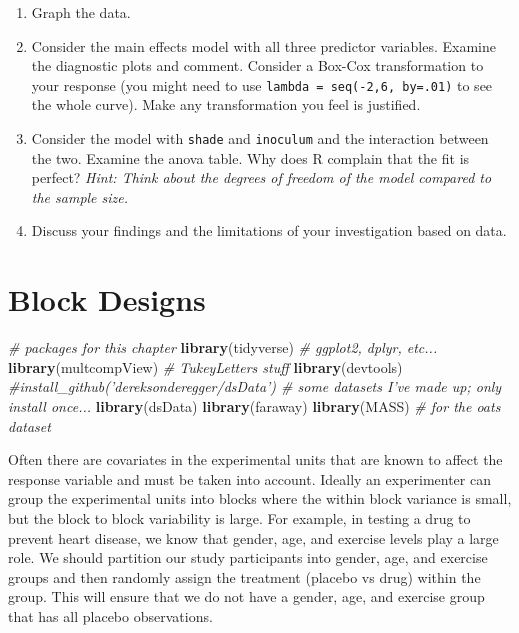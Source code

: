 \documentclass[]{book}
\newenvironment{Shaded}{\begin{snugshade}}{\end{snugshade}}
\newcommand{\KeywordTok}[1]{\textcolor[rgb]{0.13,0.29,0.53}{\textbf{{#1}}}}
\newcommand{\CommentTok}[1]{\textcolor[rgb]{0.56,0.35,0.01}{\textit{{#1}}}}
\newcommand{\NormalTok}[1]{{#1}}
\providecommand{\tightlist}{%
  \setlength{\itemsep}{0pt}\setlength{\parskip}{0pt}}
\theoremstyle{definition}
\theoremstyle{definition}
\theoremstyle{remark}
\begin{document}
\begin{enumerate}
  \begin{enumerate}
  \def\labelenumii{\alph{enumii}.}
  \tightlist
  \item
    Graph the data.
  \item
    Consider the main effects model with all three predictor variables.
    Examine the diagnostic plots and comment. Consider a Box-Cox
    transformation to your response (you might need to use
    \texttt{lambda\ =\ seq(-2,6,\ by=.01)} to see the whole curve). Make
    any transformation you feel is justified.
  \item
    Consider the model with \texttt{shade} and \texttt{inoculum} and the
    interaction between the two. Examine the anova table. Why does R
    complain that the fit is perfect? \emph{Hint: Think about the
    degrees of freedom of the model compared to the sample size.}
  \item
    Discuss your findings and the limitations of your investigation
    based on data.
  \end{enumerate}
\end{enumerate}

\chapter{Block Designs}\label{block-designs}

\begin{Shaded}
\begin{Highlighting}[]
\CommentTok{# packages for this chapter}
\KeywordTok{library}\NormalTok{(tidyverse)    }\CommentTok{# ggplot2, dplyr, etc...}
\KeywordTok{library}\NormalTok{(multcompView) }\CommentTok{# TukeyLetters stuff}
\KeywordTok{library}\NormalTok{(devtools)}
\CommentTok{#install_github('dereksonderegger/dsData')  # some datasets I've made up; only install once...}
\KeywordTok{library}\NormalTok{(dsData)}
\KeywordTok{library}\NormalTok{(faraway)}
\KeywordTok{library}\NormalTok{(MASS)         }\CommentTok{# for the oats dataset}
\end{Highlighting}
\end{Shaded}

Often there are covariates in the experimental units that are known to
affect the response variable and must be taken into account. Ideally an
experimenter can group the experimental units into blocks where the
within block variance is small, but the block to block variability is
large. For example, in testing a drug to prevent heart disease, we know
that gender, age, and exercise levels play a large role. We should
partition our study participants into gender, age, and exercise groups
and then randomly assign the treatment (placebo vs drug) within the
group. This will ensure that we do not have a gender, age, and exercise
group that has all placebo observations.
\end{document}
